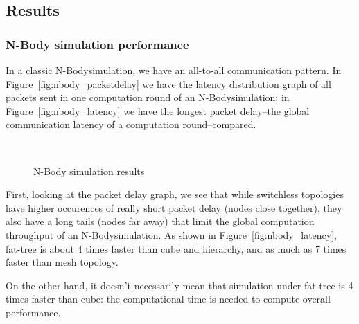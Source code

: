 \subsection {Results}


\subsubsection{N-Body simulation performance}
\newcommand{\nbody}{N-Body}
In a classic \nbody simulation, we have an all-to-all communication pattern. In Figure~\ref{fig:nbody_packetdelay} we have the latency distribution graph of all packets sent in one computation round of an \nbody simulation; in Figure~\ref{fig:nbody_latency} we have the longest packet delay--the global communication latency of a computation round--compared.

\captionsetup[subfloat]{captionskip=-0.003in}
\begin{figure}
    \centering
    \\
    \vspace{-0.1in}
    \vspace{-0.07in}
    \caption{N-Body simulation results}
    \label{fig:common_topos}
\end{figure}

First, looking at the packet delay graph, we see that while switchless topologies have higher occurences of really short packet delay (nodes close together), they also have a long tails (nodes far away) that limit the global computation throughput of an \nbody simulation. As shown in Figure~\ref{fig:nbody_latency}, fat-tree is about 4 times faster than cube and hierarchy, and as much as 7 times faster than mesh topology.

On the other hand, it doesn't necessarily mean that simulation under fat-tree is 4 times faster than cube: the computational time is needed to compute overall performance.

